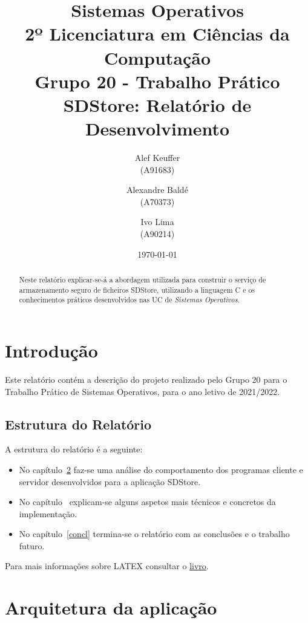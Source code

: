 \documentclass[11pt,a4paper]{report}%
\title{Sistemas Operativos\\
      2º Licenciatura em Ciências da Computação \\
      \textbf{Grupo 20 - Trabalho Prático}\\ SDStore: Relatório de Desenvolvimento
      } %
\author{Alef Keuffer\\ (A91683) \and Alexandre Baldé\\ (A70373)
         \and Ivo Lima\\ (A90214)
       } %
\date{\today} %
\def\so{\emph{Sistemas Operativos}\xspace}
\begin{document}
\maketitle %

\begin{abstract}  %
Neste relatório explicar-se-á a abordagem utilizada para construir o serviço de
armazenamento seguro de ficheiros SDStore, utilizando a linguagem C e os conhecimentos
práticos desenvolvidos nas UC de \so.
\end{abstract}

\tableofcontents %
\listoffigures %

\chapter{Introdução} \label{chap:intro} %

Este relatório contém a descrição do projeto realizado pelo Grupo 20 para
o Trabalho Prático de Sistemas Operativos, para o ano letivo de 2021/2022.


\section*{Estrutura do Relatório}

A estrutura do relatório é a seguinte:
\begin{itemize}
\item No capítulo~\ref{chap:analysis} faz-se uma análise do comportamento dos
  programas cliente e servidor desenvolvidos para a aplicação SDStore.

\item No capítulo~ explicam-se alguns aspetos mais técnicos e concretos da implementação.

\item No capítulo~\ref{concl} termina-se o relatório com as conclusões e o trabalho futuro.
\end{itemize}

Para mais informações sobre LATEX consultar o
 \href{http://www.ptep-online.com/ctan/lshort_port.pdf}{livro}.

\chapter{Arquitetura da aplicação} \label{chap:analysis} %
\end{document}
